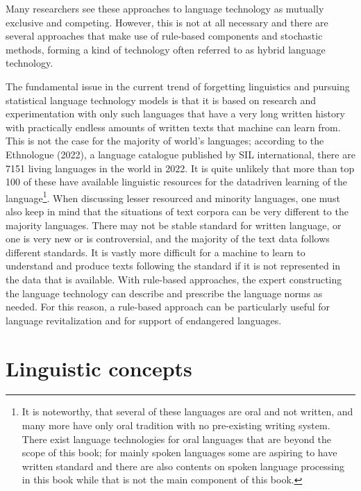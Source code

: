 \documentclass[free]{flammie}
\begin{document}
Many researchers see these approaches to language technology as mutually
exclusive and competing. However, this is not at all necessary and there are
several approaches that make use of rule-based components and stochastic
methods, forming a kind of technology often referred to as hybrid language
technology.

The fundamental issue in the current trend of forgetting linguistics and
pursuing statistical language technology models is that it is based on research
and experimentation with only such languages that have a very long written
history with practically endless amounts of written texts that machine can learn
from. This is not the case for the majority of world’s languages; according to
the Ethnologue (2022), a language catalogue published by SIL international,
there are 7151 living languages in the world in 2022. It is quite unlikely that
more than top 100 of these have available linguistic resources for the
datadriven learning of the language\footnote{It is noteworthy, that several of
these languages are oral and not written, and many more have only oral tradition
with no pre-existing writing system. There exist language technologies for oral
languages that are beyond the scope of this book; for mainly spoken languages
some are aspiring to have written standard and there are also contents on spoken
language processing in this book while that is not the main component of this
book.}. When discussing lesser resourced and minority languages, one must also
keep in mind that the situations of text corpora can be very different to the
majority languages. There may not be stable standard for written language, or
one is very new or is controversial, and the majority of the text data follows
different standards. It is vastly more difficult for a machine to learn to
understand and produce texts following the standard if it is not represented in
the data that is available. With rule-based approaches, the expert constructing
the language technology can describe and prescribe the language norms as needed.
For this reason, a rule-based approach can be particularly useful for language
revitalization and for support of endangered languages.


\section{Linguistic concepts}
\end{document}
